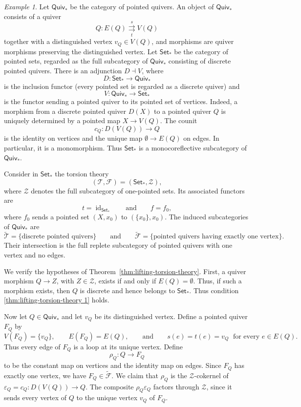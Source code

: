 \documentclass[a4paper,10pt,reqno]{amsart}
\theoremstyle{definition}
\theoremstyle{remark}
\newtheorem{example}[theorem]{Example}
\newcommand{\Set}{\mathsf{Set}}
\newcommand{\Quiv}{\mathsf{Quiv}}
\newcommand{\id}{\operatorname{id}}
\newcommand{\Cal}[1]{\mathcal{#1}}
\begin{document}
\begin{example}\label{ex:pointed-quivers}
Let $\Quiv_*$ be the category of pointed quivers. An object of $\Quiv_*$ consists of a quiver
$$
Q\colon E(Q)\overset{s}{\underset{t}{\rightrightarrows}}V(Q)
$$
together with a distinguished vertex $v_Q\in V(Q)$, and morphisms are
quiver morphisms preserving the distinguished vertex. 
Let $\Set_*$ be the category of pointed sets, regarded as the full
subcategory of $\Quiv_*$ consisting of discrete pointed quivers. There is an adjunction $D\dashv V$, where
$$
D\colon\Set_*\to\Quiv_*
$$
is the inclusion functor (every pointed set is regarded as a discrete quiver) and 
$$
V\colon\Quiv_*\to\Set_*
$$
is the functor sending a pointed quiver to its pointed set of vertices. Indeed, a morphism from a discrete pointed quiver $D(X)$ to a pointed quiver $Q$ is uniquely determined by a pointed map $X\to V(Q)$.
The counit
$$
c_Q\colon D(V(Q))\to Q
$$
is the identity on vertices and the unique map $\emptyset\to E(Q)$ on edges. In particular, it is a monomorphism. Thus $\Set_*$ is a monocoreflective subcategory of $\Quiv_*$.

Consider in $\Set_*$ the torsion theory
$$
(\Cal T,\Cal F)=(\Set_*,\Cal Z),
$$
where $\Cal Z$ denotes the full subcategory of one-pointed sets. Its associated functors
are
$$
t=\id_{\Set_*}
\qquad\text{and}\qquad
f=f_0,
$$
where $f_0$ sends a pointed set $(X,x_0)$ to $(\{x_0\}, x_0)$.
The induced subcategories of $\Quiv_*$ are
$$
\widetilde{\Cal T}
=
\{\text{discrete pointed quivers}\}
 \qquad \text{and} \qquad 
\widetilde{\Cal F}
=
\{\text{pointed quivers having exactly one vertex}\}.
$$
Their intersection is the full replete subcategory of pointed quivers with one vertex and no edges.

We verify the hypotheses of Theorem~\ref{thm:lifting-torsion-theory}.
First, a quiver morphism $Q\to Z$, with $Z \in \Cal Z$, exists if and only if $E(Q)=\emptyset$. Thus, if such a morphism exists, then $Q$ is discrete and hence belongs to $\Set_*$. Thus condition \ref{thm:lifting-torsion-theory 1} holds.

Now let $Q\in\Quiv_*$ and let $v_Q$ be its distinguished vertex. Define a pointed quiver $F_Q$ by
$$
V(F_Q)=\{v_Q\},
\qquad
E(F_Q)=E(Q),\qquad \text{and}\qquad s(e)=t(e)=v_Q \; \text{ for every } e \in E(Q).
$$
Thus every edge of $F_Q$ is a loop at its unique
vertex. Define
$$
\rho_Q\colon Q\to F_Q
$$
to be the constant map on vertices and the identity map on edges. Since $F_Q$ has exactly one vertex, we have $F_Q\in\widetilde{\Cal F}$. We claim that $\rho_Q$ is the $\Cal Z$-cokernel of $\varepsilon_Q=c_Q\colon D(V(Q))\to Q$. The composite $\rho_Q\varepsilon_Q$ factors through $\Cal Z$, since it sends
every vertex of $Q$ to the unique vertex $v_Q$ of $F_Q$.


\end{example}
\end{document}

